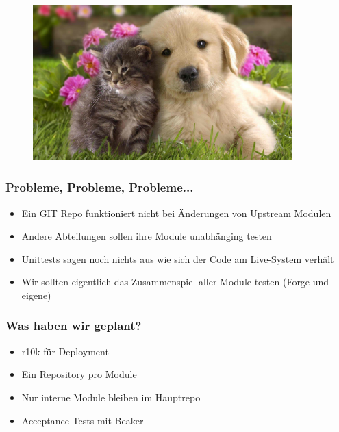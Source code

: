\documentclass{beamer}
\begin{document}
\begin{frame}
  \begin{figure}[ht]
    \centering
      \includegraphics[height=6cm,width=10cm]{../pics/puppy.png}
    \label{fig:stack}
  \end{figure}
\end{frame}

\begin{frame}
  \frametitle{Probleme, Probleme, Probleme...}

  \begin{itemize}
  \item Ein GIT Repo funktioniert nicht bei Änderungen von Upstream Modulen
  \item Andere Abteilungen sollen ihre Module unabhänging testen
  \item Unittests sagen noch nichts aus wie sich der Code am Live-System verhält
  \item Wir sollten eigentlich das Zusammenspiel aller Module testen (Forge und eigene)
  \end{itemize}
\end{frame}

\begin{frame}
  \frametitle{Was haben wir geplant?}

  \begin{itemize}
  \item r10k für Deployment
  \item Ein Repository pro Module
  \item Nur interne Module bleiben im Hauptrepo
  \item Acceptance Tests mit Beaker
  \end{itemize}
\end{frame}
\end{document}
